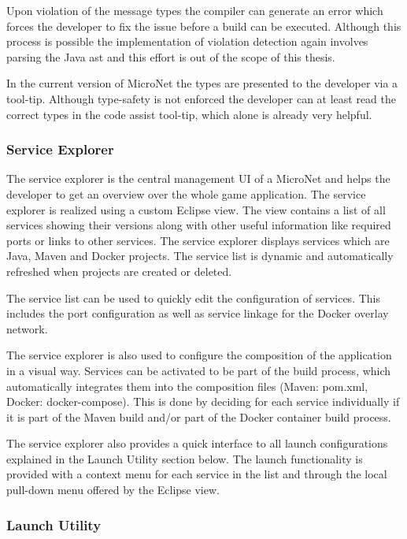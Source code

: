 Upon violation of the message types the compiler can generate an error which
forces the developer to fix the issue before a build can be executed.
Although this process is possible the implementation of violation detection
again involves parsing the Java \gls{ast} and this effort is out of the scope of
this thesis.

In the current version of MicroNet the types are presented to the developer via
a tool-tip. Although type-safety is not enforced the developer can at least read
the correct types in the code assist tool-tip, which alone is already very
helpful.


\subsubsection{Service Explorer}

The service explorer is the central management UI of a MicroNet and helps the
developer to get an overview over the whole game application. The service
explorer is realized using a custom Eclipse view. The view contains a list of
all services showing their versions along with other useful information
like required ports or links to other services. The service explorer displays
services which are Java, Maven and Docker projects. The service list is dynamic
and automatically refreshed when projects are created or deleted.

The service list can be used to quickly edit the configuration of services. This
includes the port configuration as well as service linkage for the Docker
overlay network.

The service explorer is also used to configure the composition of the
application in a visual way. Services can be activated to be part of the build
process, which automatically integrates them into the composition files (Maven:
pom.xml, Docker: docker-compose). This is done by deciding for each service
individually if it is part of the Maven build and/or part of the Docker
container build process.

The service explorer also provides a quick interface to all launch
configurations explained in the Launch Utility section below. The launch
functionality is provided with a context menu for each service in the list and
through the local pull-down menu offered by the Eclipse view.


\subsubsection{Launch Utility}


